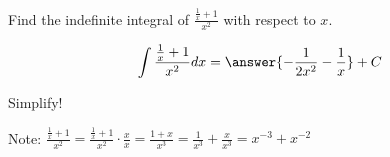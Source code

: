 \documentclass{ximera}
\author{Gregory Hartman \and Matthew Carr}
\begin{document}
\begin{exercise}

Find the indefinite integral of $\frac{\frac{1}{x}+1}{x^2}$ with respect to $x$.

\[
\int \frac{\frac{1}{x}+1}{x^2} dx=\answer{-\frac{1}{2 x^2}-\frac{1}{x}}+C
\]
\begin{hint}
Simplify!
\end{hint}
\begin{hint}
Note: $\frac{\frac{1}{x}+1}{x^2}=\frac{\frac{1}{x}+1}{x^2}\cdot \frac{x}{x}=\frac{1+x}{x^3}=\frac{1}{x^3}+\frac{x}{x^3}=x^{-3}+x^{-2}$
\end{hint}
\end{exercise}
\end{document}
